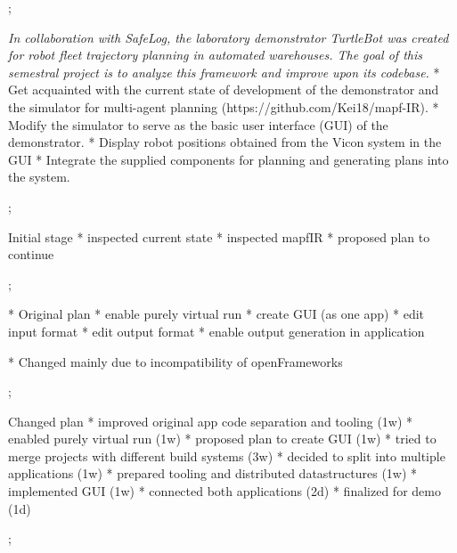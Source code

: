 

\worktype[B/EN]

\slideshow



\pg;


\textit {
    In collaboration with SafeLog, the laboratory demonstrator TurtleBot was created
    for robot fleet trajectory planning in automated warehouses. The goal of this semestral
    project is to analyze this framework and improve upon its codebase.
}
\begitems
* Get acquainted with the current state of development of the demonstrator and the simulator for multi-agent planning (https://github.com/Kei18/mapf-IR).
* Modify the simulator to serve as the basic user interface (GUI) of the demonstrator.
* Display robot positions obtained from the Vicon system in the GUI
* Integrate the supplied components for planning and generating plans into the system.
\enditems
\nl

\pg;



Initial stage
\typosize[14/14]
\begitems
* inspected current state
* inspected mapfIR
* proposed plan to continue
\enditems

\pg;


* Original plan
\typosize[14/14]
\begitems
* enable purely virtual run
* create GUI (as one app)
* edit input format
* edit output format
* enable output generation in application
\enditems

* Changed mainly due to incompatibility of openFrameworks

\pg;


Changed plan
\typosize[14/14]
\begitems
* improved original app code separation and tooling (1w)
* enabled purely virtual run (1w)
* proposed plan to create GUI (1w)
* tried to merge projects with different build systems (3w)
* decided to split into multiple applications (1w)
* prepared tooling and distributed datastructures (1w)
* implemented GUI (1w)
* connected both applications (2d)
* finalized for demo (1d)
\enditems

\pg;


